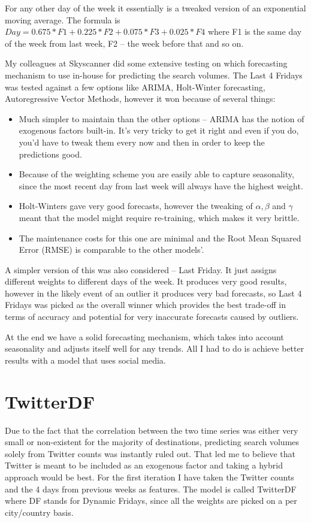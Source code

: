 \documentclass[minf,twoside,singlespacing,parskip,frontabs,notimes,11pt]{infthesis}
\begin{document}
For any other day of the week it essentially is a tweaked version of an exponential moving average. The formula is $Day=0.675*F1 + 0.225*F2 + 0.075*F3 + 0.025*F4$ where F1 is the same day of the week from last week, F2 -- the week before that and so on.


My colleagues at Skyscanner did some extensive testing on which forecasting mechanism to use in-house for predicting the search volumes. The Last 4 Fridays was tested against a few options like ARIMA, Holt-Winter forecasting, Autoregressive Vector Methods, however it won because of several things:
\begin{itemize}
\item Much simpler to maintain than the other options -- ARIMA has the notion of exogenous factors built-in. It's very tricky to get it right and even if you do, you'd have to tweak them every now and then in order to keep the predictions good. 
\item Because of the weighting scheme you are easily able to capture seasonality, since the most recent day from last week will always have the highest weight.
\item Holt-Winters gave very good forecasts, however the tweaking of $\alpha, \beta$ and $\gamma$ meant that the model might require re-training, which makes it very brittle.
\item The maintenance costs for this one are minimal and the Root Mean Squared Error (RMSE) is comparable to the other models'.
\end{itemize}

A simpler version of this was also considered -- Last Friday. It just assigns different weights to different days of the week. It produces very good results, however in the likely event of an outlier it produces very bad forecasts, so Last 4 Fridays was picked as the overall winner which provides the best trade-off in terms of accuracy and potential for very inaccurate forecasts caused by outliers.

At the end we have a solid forecasting mechanism, which takes into account seasonality and adjusts itself well for any trends. All I had to do is achieve better results with a model that uses social media. 

\section{TwitterDF}
\label{sec:df}

Due to the fact that the correlation between the two time series was either very small or non-existent for the majority of destinations, predicting search volumes solely from Twitter counts was instantly ruled out. That led me to believe that Twitter is meant to be included as an exogenous factor and taking a hybrid approach would be best. For the first iteration I have taken the Twitter counts and the 4 days from previous weeks as features. The model is called TwitterDF where DF stands for Dynamic Fridays, since all the weights are picked on a per city/country basis.
\end{document}
